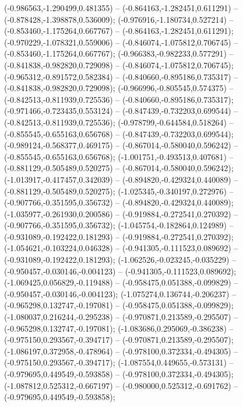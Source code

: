  (-0.986563,-1.290499,0.481355) -- (-0.864163,-1.282451,0.611291) -- (-0.878428,-1.398878,0.536009);
 (-0.976916,-1.180734,0.527214) -- (-0.853460,-1.175264,0.667767) -- (-0.864163,-1.282451,0.611291);
 (-0.970229,-1.078321,0.559006) -- (-0.846074,-1.075812,0.706745) -- (-0.853460,-1.175264,0.667767);
 (-0.966383,-0.982233,0.577291) -- (-0.841838,-0.982820,0.729098) -- (-0.846074,-1.075812,0.706745);
 (-0.965312,-0.891572,0.582384) -- (-0.840660,-0.895186,0.735317) -- (-0.841838,-0.982820,0.729098);
 (-0.966996,-0.805545,0.574375) -- (-0.842513,-0.811939,0.725536) -- (-0.840660,-0.895186,0.735317);
 (-0.971466,-0.723435,0.553124) -- (-0.847439,-0.732203,0.699544) -- (-0.842513,-0.811939,0.725536);
 (-0.978799,-0.644584,0.518264) -- (-0.855545,-0.655163,0.656768) -- (-0.847439,-0.732203,0.699544);
 (-0.989124,-0.568377,0.469175) -- (-0.867014,-0.580040,0.596242) -- (-0.855545,-0.655163,0.656768);
 (-1.001751,-0.493513,0.407681) -- (-0.881129,-0.505489,0.520275) -- (-0.867014,-0.580040,0.596242);
 (-1.013917,-0.417457,0.342039) -- (-0.894820,-0.429324,0.440089) -- (-0.881129,-0.505489,0.520275);
 (-1.025345,-0.340197,0.272976) -- (-0.907766,-0.351595,0.356732) -- (-0.894820,-0.429324,0.440089);
 (-1.035977,-0.261930,0.200586) -- (-0.919884,-0.272541,0.270392) -- (-0.907766,-0.351595,0.356732);
 (-1.045754,-0.182864,0.124989) -- (-0.931089,-0.192422,0.181293) -- (-0.919884,-0.272541,0.270392);
 (-1.054621,-0.103224,0.046328) -- (-0.941305,-0.111523,0.089692) -- (-0.931089,-0.192422,0.181293);
 (-1.062526,-0.023245,-0.035229) -- (-0.950457,-0.030146,-0.004123) -- (-0.941305,-0.111523,0.089692);
 (-1.069425,0.056829,-0.119488) -- (-0.958475,0.051388,-0.099829) -- (-0.950457,-0.030146,-0.004123);
 (-1.075274,0.136744,-0.206237) -- (-0.965298,0.132747,-0.197081) -- (-0.958475,0.051388,-0.099829);
 (-1.080037,0.216244,-0.295238) -- (-0.970871,0.213589,-0.295507) -- (-0.965298,0.132747,-0.197081);
 (-1.083686,0.295069,-0.386238) -- (-0.975150,0.293567,-0.394717) -- (-0.970871,0.213589,-0.295507);
 (-1.086197,0.372958,-0.478964) -- (-0.978100,0.372334,-0.494305) -- (-0.975150,0.293567,-0.394717);
 (-1.087554,0.449655,-0.573131) -- (-0.979695,0.449549,-0.593858) -- (-0.978100,0.372334,-0.494305);
 (-1.087812,0.525312,-0.667197) -- (-0.980000,0.525312,-0.691762) -- (-0.979695,0.449549,-0.593858);
